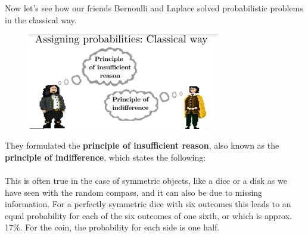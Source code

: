 \documentclass[12pt, a4paper]{scrartcl}
\begin{document}
Now let’s see how our friends Bernoulli and Laplace solved probabilistic problems in the classical way. %
\begin{figure}[H]
	\centering
	\includegraphics[width=0.75\textwidth]{1_4.png}
\end{figure}
They formulated the \textbf{principle of insufficient reason}, also known as the \textbf{principle of indifference}, which states the following:\\[0.2cm]
\\[0.2cm]
This is often true in the case of symmetric objects, like a dice or a disk as we have seen with the random compass, and it can also be due to missing information.
For a perfectly symmetric dice with six outcomes this leads to an equal probability for each of the six outcomes of one sixth, or which is approx. 17\%. 
For the coin, the probability for each side is one half.\\
\end{document}
